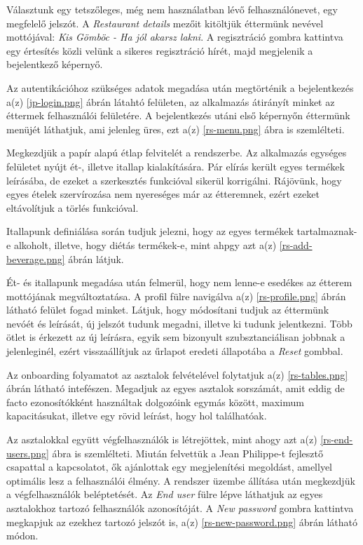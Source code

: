 Választunk egy tetszőleges, még nem használatban lévő felhasználónevet, egy megfelelő jelszót. A \emph{Restaurant details} mezőit kitöltjük éttermünk nevével mottójával: \emph{Kis Gömböc - Ha jól akarsz lakni}. A regisztráció gombra kattintva egy értesítés közli velünk a sikeres regisztráció hírét, majd megjelenik a bejelentkező képernyő.


Az autentikációhoz szükséges adatok megadása után megtörténik a bejelentkezés a(z) \ref{jp-login.png} ábrán látahtó felületen, az alkalmazás átirányít minket az éttermek felhasználói felületére. A bejelentkezés utáni első képernyőn éttermünk menüjét láthatjuk, ami jelenleg üres, ezt a(z) \ref{rs-menu.png} ábra is szemlélteti.

Megkezdjük a papír alapú étlap felvitelét a rendszerbe. Az alkalmazás egységes felületet nyújt ét-, illetve itallap kialakítására. Pár elírás került egyes termékek leírásába, de ezeket a szerkesztés funkcióval sikerül korrigálni. Rájövünk, hogy egyes ételek szervírozása nem nyereséges már az étteremnek, ezért ezeket eltávolítjuk a törlés funkcióval.


Itallapunk definiálása során tudjuk jelezni, hogy az egyes termékek tartalmaznak-e alkoholt, illetve, hogy diétás termékek-e, mint ahpgy azt a(z) \ref{rs-add-beverage.png} ábrán látjuk.

Ét- és itallapunk megadása után felmerül, hogy nem lenne-e esedékes az étterem mottójának megváltoztatása. A profil fülre navigálva a(z) \ref{rs-profile.png} ábrán látható felület fogad minket. Látjuk, hogy módosítani tudjuk az éttermünk nevóét és leírását, új jelszót tudunk megadni, illetve ki tudunk jelentkezni. Több ötlet is érkezett az új leírásra, egyik sem bizonyult szubsztanciálisan jobbnak a jelenleginél, ezért visszaállítjuk az űrlapot eredeti állapotába a \emph{Reset} gombbal.

Az onboarding folyamatot az asztalok felvételével folytatjuk a(z) \ref{rs-tables.png} ábrán látható intefészen. Megadjuk az egyes asztalok sorszámát, amit eddig de facto ezonosítókként használtak dolgozóink egymás között, maximum kapacitásukat, illetve egy rövid leírást, hogy hol találhatóak.


Az asztalokkal együtt végfelhasználók is létrejöttek, mint ahogy azt a(z) \ref{rs-end-users.png} ábra is szemlélteti. Miután felvettük a Jean Philippe-t fejlesztő csapattal a kapcsolatot, ők ajánlottak egy megjelenítési megoldást, amellyel optimális lesz a felhasználói élmény. A rendszer üzembe állítása után megkezdjük a végfelhasználók beléptetését. Az \emph{End user} fülre lépve láthatjuk az egyes asztalokhoz tartozó felhasználók azonosítóját. A \emph{New password} gombra kattintva megkapjuk az ezekhez tartozó jelszót is, a(z) \ref{rs-new-password.png} ábrán látható módon.


